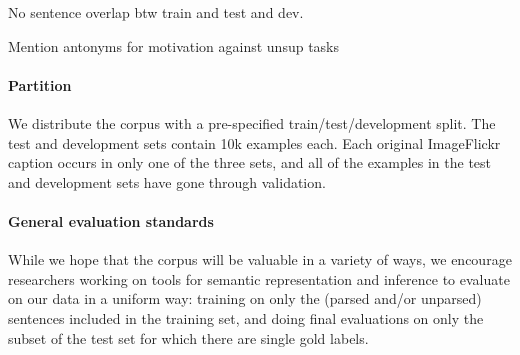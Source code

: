 No sentence overlap btw train and test and dev.

Mention antonyms for motivation against unsup tasks




\paragraph{Partition} We distribute the corpus with a pre-specified train/test/development split. The test and development sets contain 10k examples each. Each original ImageFlickr caption occurs in only one of the three sets, and all of the examples in the test and development sets have gone through validation.

\paragraph{General evaluation standards}
While we hope that the corpus will be valuable in a variety of ways, we encourage researchers working on tools for semantic representation and inference to evaluate on our data in a uniform way: training on only the (parsed and/or unparsed) sentences included in the training set, and doing final evaluations on only the subset of the test set for which there are single gold labels.
